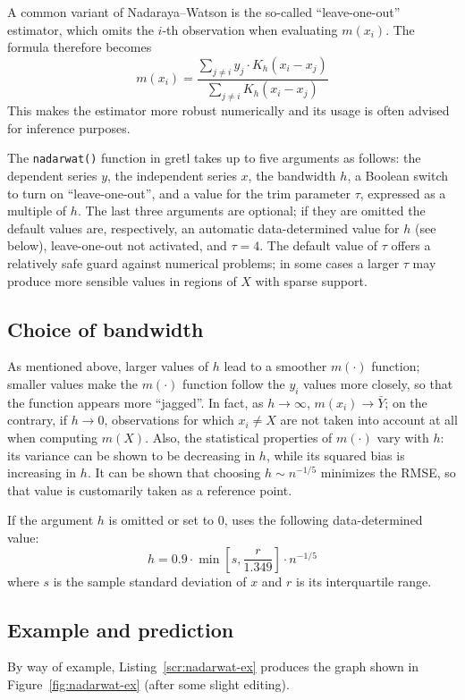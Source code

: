 A common variant of Nadaraya--Watson is the so-called
``leave-one-out'' estimator, which omits the $i$-th observation when
evaluating $m(x_i)$. The formula therefore becomes
\[
m(x_i) = \frac{ \sum_{j \ne i} y_j \cdot K_h(x_i -
  x_j)} {\sum_{j \ne i} K_h(x_i - x_j)}
\]
This makes the estimator more robust numerically and its usage is
often advised for inference purposes.

The \texttt{nadarwat()} function in gretl takes up to five arguments
as follows: the dependent series $y$, the independent series $x$, the
bandwidth $h$, a Boolean switch to turn on ``leave-one-out'', and a
value for the trim parameter $\tau$, expressed as a multiple of $h$.
The last three arguments are optional; if they are omitted the default
values are, respectively, an automatic data-determined value for $h$
(see below), leave-one-out not activated, and $\tau = 4$. The default
value of $\tau$ offers a relatively safe guard against numerical
problems; in some cases a larger $\tau$ may produce more sensible
values in regions of $X$ with sparse support.

\subsection{Choice of bandwidth}

As mentioned above, larger values of $h$ lead to a smoother $m(\cdot)$
function; smaller values make the $m(\cdot)$ function follow the $y_i$
values more closely, so that the function appears more ``jagged''. In
fact, as $h \to \infty$, $m(x_i) \to \bar{Y}$; on the contrary, if
$h \to 0$, observations for which $x_i \ne X$ are not taken into
account at all when computing $m(X)$.  Also, the statistical
properties of $m(\cdot)$ vary with $h$: its variance can be shown to
be decreasing in $h$, while its squared bias is increasing in $h$.  It
can be shown that choosing $h \sim n^{-1/5}$ minimizes the RMSE, so
that value is customarily taken as a reference point.

If the argument $h$ is omitted or set to 0,  uses
the following data-determined value:
\[
h = 0.9 \cdot \min\left[s, \frac{r}{1.349}\right] \cdot n^{-1/5}
\]
where $s$ is the sample standard deviation of $x$ and $r$ is its
interquartile range.

\subsection{Example and prediction}

By way of example, Listing~\ref{scr:nadarwat-ex} produces the graph
shown in Figure~\ref{fig:nadarwat-ex} (after some slight editing).


